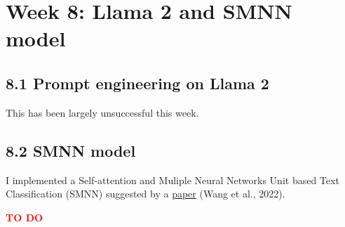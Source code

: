 \section*{Week 8: Llama 2 and SMNN model}

\subsection*{8.1 Prompt engineering on Llama 2}
This has been largely unsuccessful this week.

\subsection*{8.2 SMNN model}
I implemented a Self-attention and Muliple Neural Networks Unit based Text Classification (SMNN) suggested by a \href{https://ceur-ws.org/Vol-3304/paper30.pdf}{paper} (Wang et al., 2022).

\vspace*{20pt}
\textbf{\textcolor{red}{TO DO}}